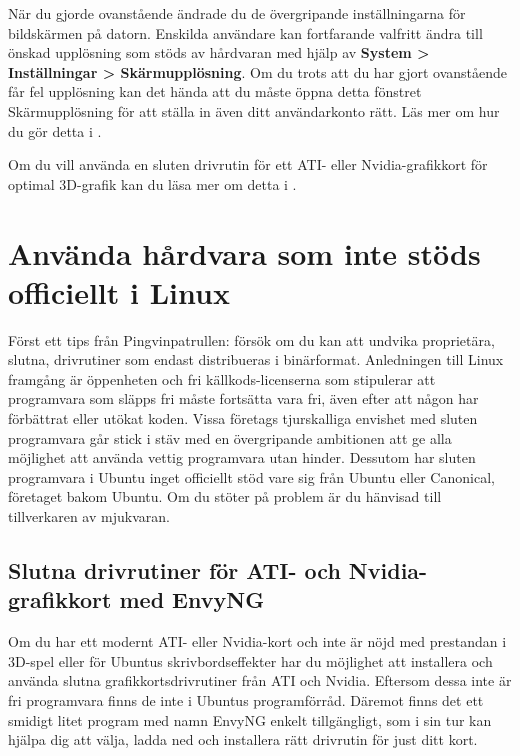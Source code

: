\documentclass[a4paper,final]{memoir} %
\begin{document}
När du gjorde ovanstående ändrade du de övergripande inställningarna för bildskärmen på datorn. Enskilda användare kan fortfarande valfritt ändra till önskad upplösning som stöds av hårdvaran med hjälp av \textbf{System \textgreater{} Inställningar \textgreater{} Skärmupplösning}. Om du trots att du har gjort ovanstående får fel upplösning kan det hända att du måste öppna detta fönstret Skärmupplösning för att ställa in även ditt användarkonto rätt. Läs mer om hur du gör detta i . 

Om du vill använda en sluten drivrutin för ett ATI- eller Nvidia-grafikkort för optimal 3D-grafik kan du läsa mer om detta i .

\section{Använda hårdvara som inte stöds officiellt i Linux}

Först ett tips från Pingvinpatrullen: försök om du kan att undvika proprietära, slutna, drivrutiner som endast distribueras i binärformat. Anledningen till Linux framgång är öppenheten och fri källkods-licenserna som stipulerar att programvara som släpps fri måste fortsätta vara fri, även efter att någon har förbättrat eller utökat koden. Vissa företags tjurskalliga envishet med sluten programvara går stick i stäv med en övergripande ambitionen att ge alla möjlighet att använda vettig programvara utan hinder. Dessutom har sluten programvara i Ubuntu inget officiellt stöd vare sig från Ubuntu eller Canonical, företaget bakom Ubuntu. Om du stöter på problem är du hänvisad till tillverkaren av mjukvaran.

\subsection{Slutna drivrutiner för ATI- och Nvidia-grafikkort med EnvyNG}\label{sec:binaryscreendrivers}


Om du har ett modernt ATI- eller Nvidia-kort och inte är nöjd med prestandan i 3D-spel eller för Ubuntus skrivbordseffekter har du möjlighet att installera och använda slutna grafikkortsdrivrutiner från ATI och Nvidia. Eftersom dessa inte är fri programvara finns de inte i Ubuntus programförråd. Däremot finns det ett smidigt litet program med namn EnvyNG enkelt tillgängligt, som i sin tur kan hjälpa dig att välja, ladda ned och installera rätt drivrutin för just ditt kort. 
\end{document}
